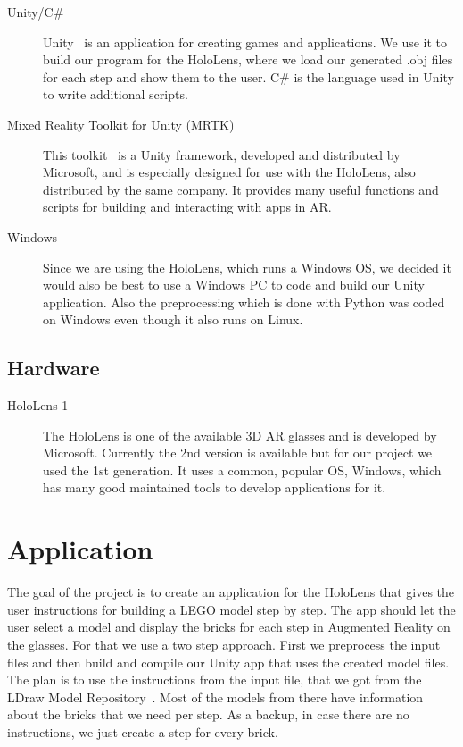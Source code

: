 \begin{description}
	\item[Unity/C\#]
	
	Unity~\cite{unity} is an application for creating games and applications. We use it to build our program for the HoloLens, where we load our generated .obj files for each step and show them to the user. C\# is the language used in Unity to write additional scripts.
	
	\item[Mixed Reality Toolkit for Unity (MRTK)]
	
	This toolkit~\cite{mrtk} is a Unity framework, developed and distributed by Microsoft, and is especially designed for use with the HoloLens, also distributed by the same company. It provides many useful functions and scripts for building and interacting with apps in AR.
	
	\newpage
	\item[Windows]
	Since we are using the HoloLens, which runs a Windows OS, we decided it would also be best to use a Windows PC to code and build our Unity application. Also the preprocessing which is done with Python was coded on Windows even though it also runs on Linux.
	
\end{description}

\subsection{Hardware}

\begin{description}
	\item[HoloLens 1]
	
	The HoloLens is one of the available 3D AR glasses and is developed by Microsoft. Currently the 2nd version is available but for our project we used the 1st generation. It uses a common, popular OS, Windows, which has many good maintained tools to develop applications for it.
\end{description}

\section{Application}

The goal of the project is to create an application for the HoloLens that gives the user instructions for building a LEGO model step by step. The app should let the user select a model and display the bricks for each step in Augmented Reality on the glasses.
For that we use a two step approach. First we preprocess the input files and then build and compile our Unity app that uses the created model files. The plan is to use the instructions from the input file, that we got from the LDraw Model Repository~\cite{omr}. Most of the models from there have information about the bricks that we need per step. As a backup, in case there are no instructions, we just create a step for every brick.

